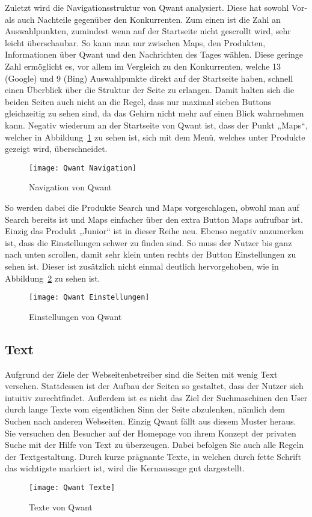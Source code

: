 Zuletzt wird die Navigationsstruktur von Qwant analysiert.
Diese hat sowohl Vor- als auch Nachteile gegenüber den Konkurrenten.
Zum einen ist die Zahl an Auswahlpunkten, zumindest wenn auf der Startseite nicht gescrollt wird, sehr leicht überschaubar.
So kann man nur zwischen Maps, den Produkten, Informationen über Qwant und den Nachrichten des Tages wählen.
Diese geringe Zahl ermöglicht es, vor allem im Vergleich zu den Konkurrenten,
welche 13 (Google) und 9 (Bing) Auswahlpunkte direkt auf der
Startseite haben, schnell einen Überblick über die Struktur der Seite zu erlangen.
Damit halten sich die beiden Seiten auch nicht an die Regel,
dass nur maximal sieben Buttons gleichzeitig zu sehen sind, da das Gehirn nicht mehr auf einen Blick
wahrnehmen kann\autocite[Seite 16]{Maulhardt.20220621b}.
Negativ wiederum an der Startseite von Qwant ist, dass der Punkt „Maps“, welcher
in Abbildung~\ref{fig:qwantnavigation} zu sehen ist, sich mit dem Menü, welches unter Produkte gezeigt wird, überschneidet.
\begin{figure}[h]
    \centering
    \texttt{[image: Qwant Navigation]}
    \caption{Navigation von Qwant}
    \label{fig:qwantnavigation}
\end{figure}

So werden dabei die
Produkte Search und Maps vorgeschlagen, obwohl man auf Search bereits ist und Maps einfacher über den extra Button Maps aufrufbar ist.
Einzig das Produkt „Junior“ ist in dieser Reihe neu.
Ebenso negativ anzumerken ist, dass die Einstellungen schwer zu finden sind.
So muss der Nutzer bis ganz nach unten scrollen, damit sehr klein unten rechts der Button Einstellungen zu sehen ist.
Dieser ist zusätzlich nicht einmal deutlich hervorgehoben, wie in Abbildung~\ref{fig:qwanteinstellungen} zu sehen ist.
\begin{figure}[h]
    \centering
    \texttt{[image: Qwant Einstellungen]}
    \caption{Einstellungen von Qwant}
    \label{fig:qwanteinstellungen}
\end{figure}

\subsection{Text}\label{subsec:text}
Aufgrund der Ziele der Webseitenbetreiber sind die Seiten mit wenig Text versehen.
Stattdessen ist der Aufbau der Seiten so gestaltet, dass der Nutzer sich intuitiv zurechtfindet.
Außerdem ist es nicht das Ziel der Suchmaschinen den User durch lange Texte vom eigentlichen Sinn der Seite abzulenken,
nämlich dem Suchen nach anderen Webseiten.
Einzig Qwant fällt aus diesem Muster heraus.
Sie versuchen den Besucher auf der Homepage von ihrem Konzept der privaten Suche mit der Hilfe von Text zu überzeugen.
Dabei befolgen Sie auch alle Regeln der Textgestaltung\autocite[Seite 5ff]{Maulhardt.20220621b}.
Durch kurze prägnante Texte, in welchen durch fette Schrift das wichtigste markiert ist, wird die Kernaussage gut dargestellt.
\begin{figure}[ht]
    \centering
    \texttt{[image: Qwant Texte]}
    \caption{Texte von Qwant}\label{fig:figure9}
\end{figure}

